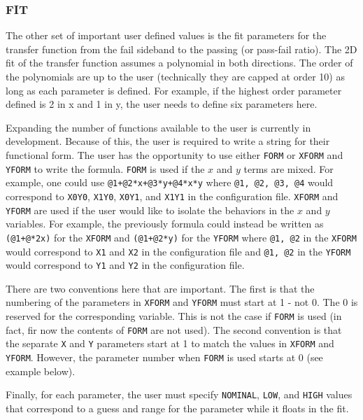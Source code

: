 \documentclass[letter]{article}
\begin{document}
        \subsubsection{FIT}
            The other set of important user defined values is the fit parameters for the transfer function from the fail sideband to the passing (or pass-fail ratio). The 2D fit of the transfer function assumes a polynomial in both directions. The order of the polynomials are up to the user (technically they are capped at order 10) as long as each parameter is defined. For example, if the highest order parameter defined is 2 in x and 1 in y, the user needs to define six parameters here.

            Expanding the number of functions available to the user is currently in development. Because of this, the user is required to write a string for their functional form. The user has the opportunity to use either \verb"FORM" or \verb"XFORM" and \verb"YFORM" to write the formula. \verb"FORM" is used if the $x$ and $y$ terms are mixed. For example, one could use \verb"@1+@2*x+@3*y+@4*x*y" where \verb"@1, @2, @3, @4" would correspond to \verb"X0Y0", \verb"X1Y0", \verb"X0Y1", and \verb"X1Y1" in the configuration file. \verb"XFORM" and \verb"YFORM" are used if the user would like to isolate the behaviors in the $x$ and $y$ variables. For example, the previously formula could instead be written as \verb"(@1+@*2x)" for the \verb"XFORM" and \verb"(@1+@2*y)" for the \verb"YFORM" where \verb"@1, @2" in the \verb"XFORM" would correspond to \verb"X1" and \verb"X2" in the configuration file and \verb"@1, @2" in the \verb"YFORM" would correspond to \verb"Y1" and \verb"Y2" in the configuration file.

            There are two conventions here that are important. The first is that the numbering of the parameters in \verb"XFORM" and \verb"YFORM" must start at 1 - not 0. The 0 is reserved for the corresponding variable. This is not the case if \verb"FORM" is used (in fact, fir now the contents of \verb"FORM" are not used). The second convention is that the separate \verb"X" and \verb"Y" parameters start at 1 to match the values in \verb"XFORM" and \verb"YFORM". However, the parameter number when \verb"FORM" is used starts at 0 (see example below). 

            Finally, for each parameter, the user must specify \verb"NOMINAL", \verb"LOW", and \verb"HIGH" values that correspond to a guess and range for the parameter while it floats in the fit.
\end{document}
